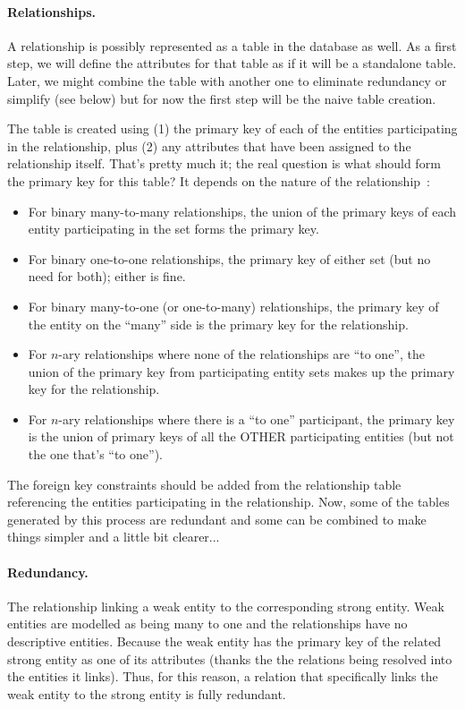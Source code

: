 \paragraph{Relationships.} 
A relationship is possibly represented as a table in the database as well. As a first step, we will define the attributes for that table as if it will be a standalone table. Later, we might combine the table with another one to eliminate redundancy or simplify (see below) but for now the first step will be the naive table creation.

The table is created using (1) the primary key of each of the entities participating in the relationship, plus (2) any attributes that have been assigned to the relationship itself. That's pretty much it; the real question is what should form the primary key for this table? It depends on the nature of the relationship~\cite{dsc}:

\begin{itemize}
	\item For binary many-to-many relationships, the union of the primary keys of each entity participating in the set forms the primary key.
	\item For binary one-to-one relationships, the primary key of either set (but no need for both); either is fine.
	\item For binary many-to-one (or one-to-many) relationships, the primary key of the entity on the ``many'' side is the primary key for the relationship.
	\item For $n$-ary relationships where none of the relationships are ``to one'', the union of the primary key from participating entity sets makes up the primary key for the relationship.
	\item For $n$-ary relationships where there is a ``to one'' participant, the primary key is the union of primary keys of all the OTHER participating entities (but not the one that's ``to one''). 
\end{itemize}

The foreign key constraints should be added from the relationship table referencing the entities participating in the relationship. Now, some of the tables generated by this process are redundant and some can be combined to make things simpler and a little bit clearer...

\paragraph{Redundancy.}
The relationship linking a weak entity to the corresponding strong entity. Weak entities are modelled as being many to one and the relationships have no descriptive entities. Because the weak entity has the primary key of the related strong entity as one of its attributes (thanks the the relations being resolved into the entities it links). Thus, for this reason, a relation that specifically links the weak entity to the strong entity is fully redundant. 

